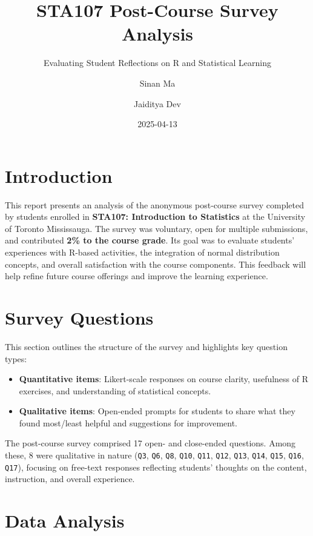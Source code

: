 \documentclass[
  letterpaper,
  DIV=11,
  numbers=noendperiod]{scrartcl}
\title{STA107 Post-Course Survey Analysis}
\subtitle{Evaluating Student Reflections on R and Statistical Learning}
\author{Sinan Ma \and Jaiditya Dev}
\date{2025-04-13}
\providecommand{\tightlist}{%
  \setlength{\itemsep}{0pt}\setlength{\parskip}{0pt}}\usepackage{longtable,booktabs,array}
\renewcommand*\contentsname{Table of contents}
\newcommand\contentsname{Table of contents}
\begin{document}
\maketitle

\renewcommand*\contentsname{Table of contents}
{
\hypersetup{linkcolor=}
\setcounter{tocdepth}{3}
\tableofcontents
}

\section{Introduction}\label{introduction}

This report presents an analysis of the anonymous post-course survey
completed by students enrolled in \textbf{STA107: Introduction to
Statistics} at the University of Toronto Mississauga. The survey was
voluntary, open for multiple submissions, and contributed \textbf{2\% to
the course grade}. Its goal was to evaluate students' experiences with
R-based activities, the integration of normal distribution concepts, and
overall satisfaction with the course components. This feedback will help
refine future course offerings and improve the learning experience.

\section{Survey Questions}\label{survey-questions}

This section outlines the structure of the survey and highlights key
question types:

\begin{itemize}
\tightlist
\item
  \textbf{Quantitative items}: Likert-scale responses on course clarity,
  usefulness of R exercises, and understanding of statistical concepts.
\item
  \textbf{Qualitative items}: Open-ended prompts for students to share
  what they found most/least helpful and suggestions for improvement.
\end{itemize}

The post-course survey comprised 17 open- and close-ended questions.
Among these, 8 were qualitative in nature (\texttt{Q3}, \texttt{Q6},
\texttt{Q8}, \texttt{Q10}, \texttt{Q11}, \texttt{Q12}, \texttt{Q13},
\texttt{Q14}, \texttt{Q15}, \texttt{Q16}, \texttt{Q17}), focusing on
free-text responses reflecting students' thoughts on the content,
instruction, and overall experience.

\section{Data Analysis}\label{data-analysis}
\end{document}
